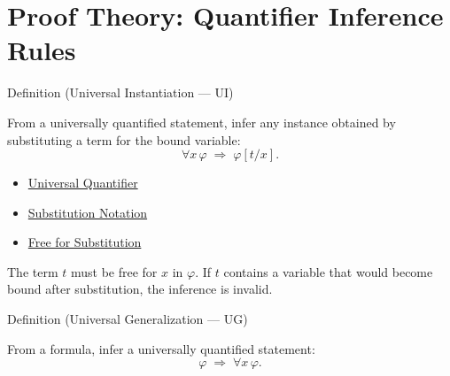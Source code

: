 
\section{Proof Theory: Quantifier Inference Rules}


\begin{definitionbox}{Definition (Universal Instantiation — UI)}
\begin{definition}\label{def:ui}
From a universally quantified statement, infer any instance obtained by
substituting a term for the bound variable:
\[
\forall x\,\varphi \;\Rightarrow\; \varphi[t/x].
\]
\end{definition}
\end{definitionbox}

\begin{dependencies}
\begin{itemize}
  \item \hyperref[def:universal-q]{Universal Quantifier}
  \item \hyperref[def:subst-notation]{Substitution Notation}
  \item \hyperref[def:free-for]{Free for Substitution}
\end{itemize}
\end{dependencies}

\begin{remark*}
The term $t$ must be free for $x$ in $\varphi$. If $t$ contains a variable
that would become bound after substitution, the inference is invalid.
\end{remark*}

\begin{definitionbox}{Definition (Universal Generalization — UG)}
\begin{definition}\label{def:ug}
From a formula, infer a universally quantified statement:
\[
\varphi \;\Rightarrow\; \forall x\,\varphi.
\]
\end{definition}
\end{definitionbox}

